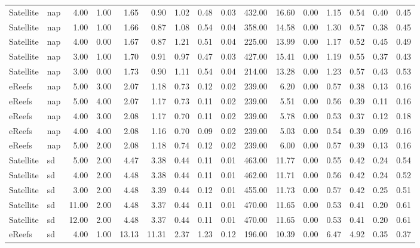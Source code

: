 \begin{table}[ht]
\begin{tabular}{llrrrrrrrrrrrrrr}
   \midrule
Satellite & nap & 4.00 & 1.00 & 1.65 & 0.90 & 1.02 & 0.48 & 0.03 & 432.00 & 16.60 & 0.00 & 1.15 & 0.54 & 0.40 & 0.45 \\ 
  Satellite & nap & 1.00 & 1.00 & 1.66 & 0.87 & 1.08 & 0.54 & 0.04 & 358.00 & 14.58 & 0.00 & 1.30 & 0.57 & 0.38 & 0.45 \\ 
  Satellite & nap & 4.00 & 0.00 & 1.67 & 0.87 & 1.21 & 0.51 & 0.04 & 225.00 & 13.99 & 0.00 & 1.17 & 0.52 & 0.45 & 0.49 \\ 
  Satellite & nap & 3.00 & 1.00 & 1.70 & 0.91 & 0.97 & 0.47 & 0.03 & 427.00 & 15.41 & 0.00 & 1.19 & 0.55 & 0.37 & 0.43 \\ 
  Satellite & nap & 3.00 & 0.00 & 1.73 & 0.90 & 1.11 & 0.54 & 0.04 & 214.00 & 13.28 & 0.00 & 1.23 & 0.57 & 0.43 & 0.53 \\ 
  eReefs & nap & 5.00 & 3.00 & 2.07 & 1.18 & 0.73 & 0.12 & 0.02 & 239.00 & 6.20 & 0.00 & 0.57 & 0.38 & 0.13 & 0.16 \\ 
  eReefs & nap & 5.00 & 4.00 & 2.07 & 1.17 & 0.73 & 0.11 & 0.02 & 239.00 & 5.51 & 0.00 & 0.56 & 0.39 & 0.11 & 0.16 \\ 
  eReefs & nap & 4.00 & 3.00 & 2.08 & 1.17 & 0.70 & 0.11 & 0.02 & 239.00 & 5.78 & 0.00 & 0.53 & 0.37 & 0.12 & 0.18 \\ 
  eReefs & nap & 4.00 & 4.00 & 2.08 & 1.16 & 0.70 & 0.09 & 0.02 & 239.00 & 5.03 & 0.00 & 0.54 & 0.39 & 0.09 & 0.16 \\ 
  eReefs & nap & 5.00 & 2.00 & 2.08 & 1.18 & 0.74 & 0.12 & 0.02 & 239.00 & 6.00 & 0.00 & 0.57 & 0.39 & 0.13 & 0.16 \\ 
   \midrule
Satellite & sd & 5.00 & 2.00 & 4.47 & 3.38 & 0.44 & 0.11 & 0.01 & 463.00 & 11.77 & 0.00 & 0.55 & 0.42 & 0.24 & 0.54 \\ 
  Satellite & sd & 4.00 & 2.00 & 4.48 & 3.38 & 0.44 & 0.11 & 0.01 & 462.00 & 11.71 & 0.00 & 0.56 & 0.42 & 0.24 & 0.52 \\ 
  Satellite & sd & 3.00 & 2.00 & 4.48 & 3.39 & 0.44 & 0.12 & 0.01 & 455.00 & 11.73 & 0.00 & 0.57 & 0.42 & 0.25 & 0.51 \\ 
  Satellite & sd & 11.00 & 2.00 & 4.48 & 3.37 & 0.44 & 0.11 & 0.01 & 470.00 & 11.65 & 0.00 & 0.53 & 0.41 & 0.20 & 0.61 \\ 
  Satellite & sd & 12.00 & 2.00 & 4.48 & 3.37 & 0.44 & 0.11 & 0.01 & 470.00 & 11.65 & 0.00 & 0.53 & 0.41 & 0.20 & 0.61 \\ 
  eReefs & sd & 4.00 & 1.00 & 13.13 & 11.31 & 2.37 & 1.23 & 0.12 & 196.00 & 10.39 & 0.00 & 6.47 & 4.92 & 0.35 & 0.37 \\ 

\end{tabular}
\end{table}
